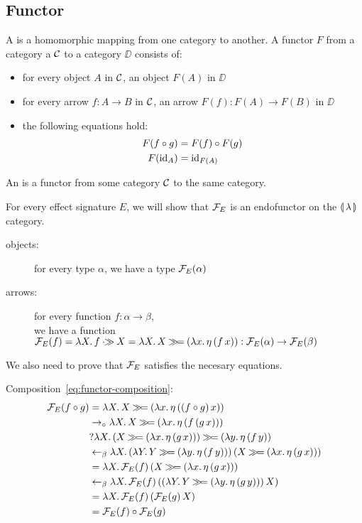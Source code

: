 \subsection{Functor}
\label{ssec:functor}

\begin{definition}
A  is a homomorphic mapping from one category to
another. A functor $F$ from a category a $\mathcal{C}$ to a category $\DD$
consists of:
\begin{itemize}
\item for every object $A$ in $\mathcal{C}$, an object $F(A)$ in $\DD$
\item for every arrow $f : A \to B$ in $\mathcal{C}$, an arrow $F(f) : F(A) \to
  F(B)$ in $\DD$
\item the following equations hold:
  \begin{align}
    \label{eq:functor-composition}F(f \circ g) &= F(f) \circ F(g) \\
    \label{eq:functor-identity}F(\mathrm{id}_A) &= \mathrm{id}_{F(A)}
  \end{align}
\end{itemize}
\end{definition}

\begin{definition}
  An  is a functor from some category $\mathcal{C}$ to the same
  category.
\end{definition}

For every effect signature $E$, we will show that $\mathcal{F}_E$ is an endofunctor
on the $\llparenthesis \, \lambda \, \rrparenthesis$ category.
\begin{description}
\item[objects:] for every type $\alpha$, we have a type $\mathcal{F}_E(\alpha)$
\item[arrows:] for every function $f : \alpha \to \beta$, \\ we have a
  function $\mathcal{F}_E(f) = \lambda X.\, f \mathbin{\cdot\!\!\gg} X = \lambda X.\, X \mathbin{\gg\!=}
  (\lambda x.\, \eta\,(f\,x)) : \mathcal{F}_E(\alpha) \to \mathcal{F}_E(\beta)$
\end{description}

We also need to prove that $\mathcal{F}_E$ satisfies the necesary equations.

Composition~\eqref{eq:functor-composition}:
\begin{align*}
  \FF_E(f \circ g)
  &= \lam{X}{X \hsbind (\lam{x}{\etaE{(\ap{(f \circ g)}{x})}})} \\
  &\to_\circ \lam{X}{X \hsbind (\lam{x}{\etaE{(\ap{f}{(\ap{g}{x})})}})} \\
  &? \lam{X}{(X \hsbind (\lam{x}{\etaE{(\ap{g}{x})}})) \hsbind (\lam{y}{\etaE{(\ap{f}{y})}})} \\
  &\from_\beta \lam{X}{\ap{(\lam{Y}{Y \hsbind (\lam{y}{\etaE{(\ap{f}{y})}})})}{(X \hsbind (\lam{x}{\etaE{(\ap{g}{x})}}))}} \\
  &= \lam{X}{\ap{\FF_E(f)}{(X \hsbind (\lam{x}{\etaE{(\ap{g}{x})}}))}} \\
  &\from_\beta \lam{X}{\ap{\FF_E(f)}{(\ap{(\lam{Y}{Y \hsbind (\lam{y}{\etaE{(\ap{g}{y})}})})}{X})}} \\
  &= \lam{X}{\ap{\FF_E(f)}{(\ap{\FF_E(g)}{X})}} \\
  &= \FF_E(f) \circ \FF_E(g)
\end{align*}

